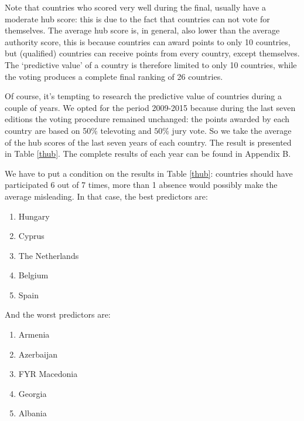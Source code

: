 \documentclass[a4paper,11pt]{report}
\begin{document}
Note that countries who scored very well during 
the final, usually have a moderate hub score: this is due to the fact that 
countries can not vote for themselves. The average hub score is, in general, also 
lower than the average authority score, this is because countries can award 
points to only 10 countries, but (qualified) countries can receive points from 
every country, except themselves. The `predictive value' of a country is 
therefore limited to only 10 countries, while the voting produces a complete final ranking of 26 
countries.

Of course, it's tempting to research the predictive value of countries during a 
couple of years. We opted for the period 2009-2015 because during the last seven 
editions the voting procedure remained unchanged: the points awarded by each country are based on 50$\%$ televoting and
$50\%$ jury vote. So we take the average of the hub scores of the last seven
years of each country. The result is presented in Table \ref{thub}. The complete results of each year can be found in Appendix B. 

We have to put a  condition on the results in Table \ref{thub}: countries should 
have participated 6 out of 7 times, more than 1 absence would possibly make the average misleading. 
In that case, the best predictors are:

\begin{enumerate}
  \item Hungary
  \item Cyprus
  \item The Netherlands
  \item Belgium
  \item Spain
\end{enumerate}

And the worst predictors are:
\begin{enumerate}
  \item Armenia
  \item Azerbaijan
  \item FYR Macedonia
  \item Georgia
  \item Albania
\end{enumerate}
\end{document}
